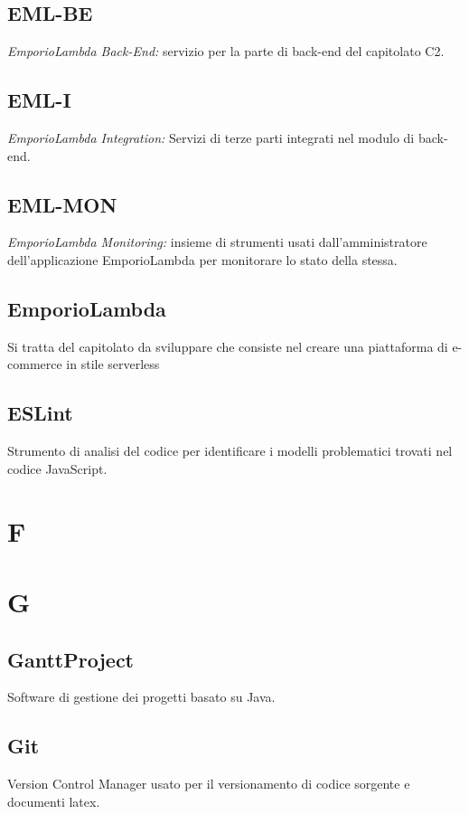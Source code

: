 \subsection*{EML-BE}
\textit{EmporioLambda Back-End:} servizio per la parte di back-end del capitolato C2.

\subsection*{EML-I}
\textit{EmporioLambda Integration:} Servizi di terze parti integrati nel modulo di back-end.

\subsection*{EML-MON}
\textit{EmporioLambda Monitoring:} insieme di strumenti usati dall'amministratore dell'applicazione EmporioLambda per monitorare lo stato della stessa.

\subsection*{EmporioLambda}
Si tratta del capitolato da sviluppare che consiste nel creare una piattaforma di e-commerce in stile serverless

\subsection*{ESLint}
Strumento di analisi del codice per identificare i modelli problematici trovati nel codice JavaScript.

\newpage
\section{F}


\newpage
\section{G}
\subsection*{GanttProject}
Software di gestione dei progetti basato su Java.

\subsection*{Git}
Version Control Manager usato per il versionamento di codice sorgente e documenti latex.

